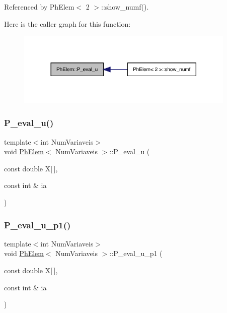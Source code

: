 Referenced by Ph\+Elem$<$ 2 $>$\+::show\+\_\+numf().

Here is the caller graph for this function\+:
\nopagebreak
\begin{figure}[H]
\begin{center}
\leavevmode
\includegraphics[width=296pt]{classPhElem_acd85a3728b9566c086c1450a35e6231f_icgraph}
\end{center}
\end{figure}
\mbox{\label{classPhElem_aa648874799b8fa49fdccbcbc9b8de504}} 
\subsubsection{\texorpdfstring{P\+\_\+eval\+\_\+u()}{P\_eval\_u()}\hspace{0.1cm}{\footnotesize\ttfamily [2/2]}}
{\footnotesize\ttfamily template$<$int Num\+Variaveis$>$ \\
void \hyperlink{classPhElem}{Ph\+Elem}$<$ Num\+Variaveis $>$\+::P\+\_\+eval\+\_\+u (\begin{DoxyParamCaption}\item[{const double}]{X\mbox{[}$\,$\mbox{]},  }\item[{const int \&}]{ia }\end{DoxyParamCaption})}

\mbox{\label{classPhElem_a69032d622789084c4416981e2fceb80c}} 
\subsubsection{\texorpdfstring{P\+\_\+eval\+\_\+u\+\_\+p1()}{P\_eval\_u\_p1()}}
{\footnotesize\ttfamily template$<$int Num\+Variaveis$>$ \\
void \hyperlink{classPhElem}{Ph\+Elem}$<$ Num\+Variaveis $>$\+::P\+\_\+eval\+\_\+u\+\_\+p1 (\begin{DoxyParamCaption}\item[{const double}]{X\mbox{[}$\,$\mbox{]},  }\item[{const int \&}]{ia }\end{DoxyParamCaption})}



